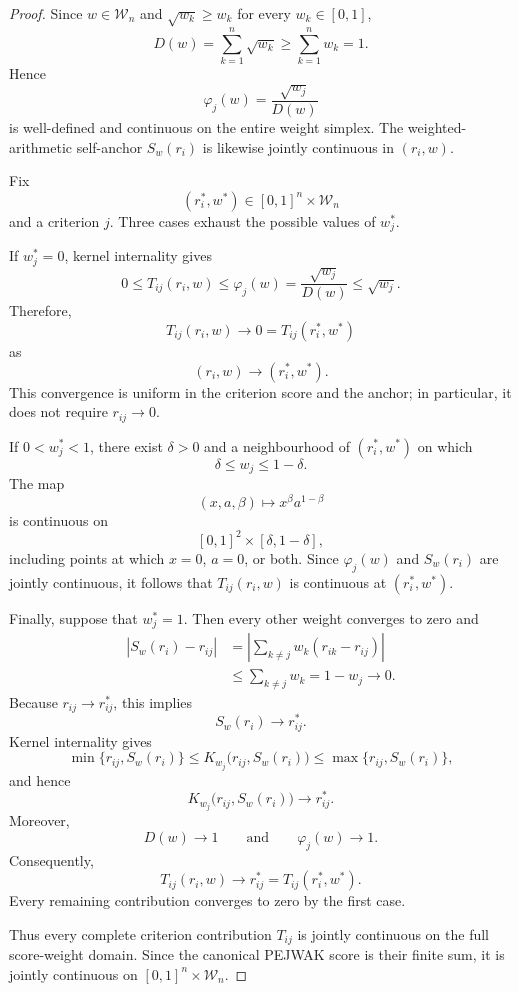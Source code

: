 \documentclass[reqno,11pt]{amsart}
\theoremstyle{definition}
\theoremstyle{plain}
\theoremstyle{remark}
\begin{document}
\begin{proof}
Since \(w\in\mathcal W_n\) and
\(\sqrt{w_k}\geq w_k\) for every \(w_k\in[0,1]\),
\[
D(w)
=
\sum_{k=1}^{n}\sqrt{w_k}
\geq
\sum_{k=1}^{n}w_k
=
1.
\]
Hence
\[
\varphi_j(w)
=
\frac{\sqrt{w_j}}{D(w)}
\]
is well-defined and continuous on the entire weight simplex.
The weighted-arithmetic self-anchor \(S_w(r_i)\) is likewise jointly
continuous in \((r_i,w)\).

Fix
\[
(r_i^\ast,w^\ast)
\in
[0,1]^n\times\mathcal W_n
\]
and a criterion \(j\). Three cases exhaust the possible values of
\(w_j^\ast\).

If \(w_j^\ast=0\), kernel internality gives
\[
0
\leq
T_{ij}(r_i,w)
\leq
\varphi_j(w)
=
\frac{\sqrt{w_j}}{D(w)}
\leq
\sqrt{w_j}.
\]
Therefore,
\[
T_{ij}(r_i,w)
\longrightarrow
0
=
T_{ij}(r_i^\ast,w^\ast)
\]
as
\[
(r_i,w)\longrightarrow(r_i^\ast,w^\ast).
\]
This convergence is uniform in the criterion score and the anchor; in
particular, it does not require \(r_{ij}\to0\).

If \(0<w_j^\ast<1\), there exist \(\delta>0\) and a neighbourhood of
\((r_i^\ast,w^\ast)\) on which
\[
\delta
\leq
w_j
\leq
1-\delta.
\]
The map
\[
(x,a,\beta)
\longmapsto
x^\beta a^{1-\beta}
\]
is continuous on
\[
[0,1]^2\times[\delta,1-\delta],
\]
including points at which \(x=0\), \(a=0\), or both. Since
\(\varphi_j(w)\) and \(S_w(r_i)\) are jointly continuous, it follows that
\(T_{ij}(r_i,w)\) is continuous at \((r_i^\ast,w^\ast)\).

Finally, suppose that \(w_j^\ast=1\). Then every other weight converges
to zero and
\[
\begin{aligned}
\left|S_w(r_i)-r_{ij}\right|
&=
\left|
\sum_{k\neq j}w_k(r_{ik}-r_{ij})
\right| \\
&\leq
\sum_{k\neq j}w_k
=
1-w_j
\longrightarrow0.
\end{aligned}
\]
Because \(r_{ij}\to r_{ij}^\ast\), this implies
\[
S_w(r_i)\longrightarrow r_{ij}^\ast.
\]
Kernel internality gives
\[
\min\{r_{ij},S_w(r_i)\}
\leq
K_{w_j}\bigl(r_{ij},S_w(r_i)\bigr)
\leq
\max\{r_{ij},S_w(r_i)\},
\]
and hence
\[
K_{w_j}\bigl(r_{ij},S_w(r_i)\bigr)
\longrightarrow
r_{ij}^\ast.
\]
Moreover,
\[
D(w)\longrightarrow1
\qquad\text{and}\qquad
\varphi_j(w)\longrightarrow1.
\]
Consequently,
\[
T_{ij}(r_i,w)
\longrightarrow
r_{ij}^\ast
=
T_{ij}(r_i^\ast,w^\ast).
\]
Every remaining contribution converges to zero by the first case.

Thus every complete criterion contribution \(T_{ij}\) is jointly
continuous on the full score-weight domain. Since the canonical PEJWAK
score is their finite sum, it is jointly continuous on
\([0,1]^n\times\mathcal W_n\).
\end{proof}
\end{document}
